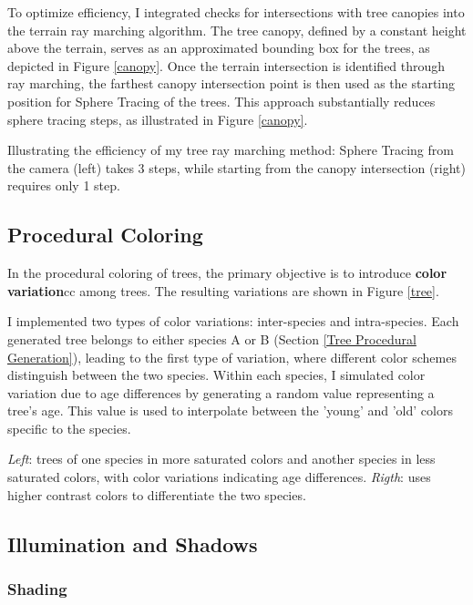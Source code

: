 To optimize efficiency, I integrated checks for intersections with tree canopies into the terrain ray marching algorithm. The tree canopy, defined by a constant height above the terrain, serves as an approximated bounding box for the trees, as depicted in Figure \ref{canopy}. Once the terrain intersection is identified through ray marching, the farthest canopy intersection point is then used as the starting position for Sphere Tracing of the trees. This approach substantially reduces sphere tracing steps, as illustrated in Figure \ref{canopy}. 

{Illustrating the efficiency of my tree ray marching method: Sphere Tracing from the camera (left) takes 3 steps, while starting from the canopy intersection (right) requires only 1 step.}

\subsection{Procedural Coloring}

In the procedural coloring of trees, the primary objective is to introduce \textbf{color variation}cc among trees. The resulting variations are shown in Figure \ref{tree}.

I implemented two types of color variations: inter-species and intra-species. Each generated tree belongs to either species A or B (Section \ref{Tree Procedural Generation}), leading to the first type of variation, where different color schemes distinguish between the two species. Within each species, I simulated color variation due to age differences by generating a random value representing a tree's age. This value is used to interpolate between the 'young' and 'old' colors specific to the species.

{\textit{Left}: trees of one species in more saturated colors and another species in less saturated colors, with color variations indicating age differences. \textit{Rigth}: uses higher contrast colors to differentiate the two species.}

\subsection{Illumination and Shadows}

\subsubsection{Shading}

